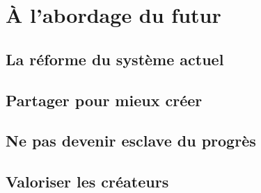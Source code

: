 \chapter{À l'abordage du futur}

\section{La réforme du système actuel}

\section{Partager pour mieux créer}

\section{Ne pas devenir esclave du progrès}

\section{Valoriser les créateurs}
